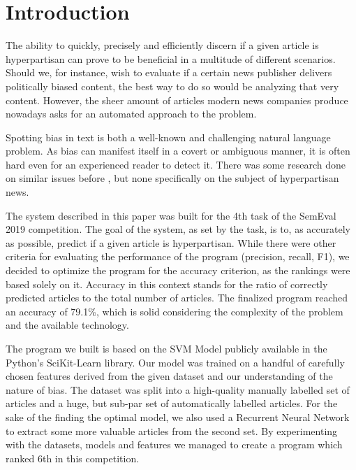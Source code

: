 \section{Introduction}
\label{sec:intro}

The ability to quickly, precisely and efficiently discern if a given article is hyperpartisan can prove to be beneficial in a multitude of different scenarios.
Should we, for instance, wish to evaluate if a certain news publisher delivers politically biased content, the best way to do so would be analyzing that very content.
However, the sheer amount of articles modern news companies produce nowadays asks for an automated approach to the problem.

Spotting bias in text is both a well-known and challenging natural language problem. As bias can manifest itself in a covert or ambiguous manner, it is often
hard even for an experienced reader to detect it. 
There was some research done on similar issues before \citep{doumit2011online}, but none specifically on the subject of hyperpartisan news.

The system described in this paper was built for the 4th task of the SemEval 2019 competition. The goal of the system, as set by the task, is to, as accurately as possible, 
predict if a given article is hyperpartisan. While there were other criteria for evaluating the performance of the program (precision, recall, F1), we decided to optimize 
the program for the accuracy criterion, as the rankings were based solely on it. Accuracy in this context stands for the ratio of correctly predicted articles to the total 
number of articles. The finalized program reached an accuracy of 79.1\%, which is solid considering the complexity of the problem and the available technology.

The program we built is based on the SVM Model publicly available in the Python's SciKit-Learn library. Our model was trained on a handful of carefully chosen features
derived from the given dataset and our understanding of the nature of bias. The dataset was split into a high-quality manually labelled set of articles and a huge, but sub-par
set of automatically labelled articles. For the sake of the finding the optimal model, we also used a Recurrent Neural Network to extract some more valuable articles from the
second set. By experimenting with the datasets, models and features we managed to create a program which ranked 6th in this competition.
